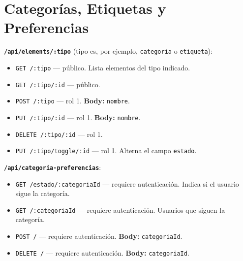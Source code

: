 \section{Categorías, Etiquetas y Preferencias}
\textbf{\texttt{/api/elements/:tipo}} (tipo es, por ejemplo, \texttt{categoria} o \texttt{etiqueta}):
\begin{itemize}
    \item \texttt{GET /:tipo} — público. Lista elementos del tipo indicado.
    \item \texttt{GET /:tipo/:id} — público.
    \item \texttt{POST /:tipo} — rol 1. \textbf{Body:} \texttt{nombre}.
    \item \texttt{PUT /:tipo/:id} — rol 1. \textbf{Body:} \texttt{nombre}.
    \item \texttt{DELETE /:tipo/:id} — rol 1.
    \item \texttt{PUT /:tipo/toggle/:id} — rol 1. Alterna el campo \texttt{estado}.
\end{itemize}
\textbf{\texttt{/api/categoria-preferencias}}:
\begin{itemize}
    \item \texttt{GET /estado/:categoriaId} — requiere autenticación. Indica si el usuario sigue la categoría.
    \item \texttt{GET /:categoriaId} — requiere autenticación. Usuarios que siguen la categoría.
    \item \texttt{POST /} — requiere autenticación. \textbf{Body:} \texttt{categoriaId}.
    \item \texttt{DELETE /} — requiere autenticación. \textbf{Body:} \texttt{categoriaId}.
\end{itemize}

